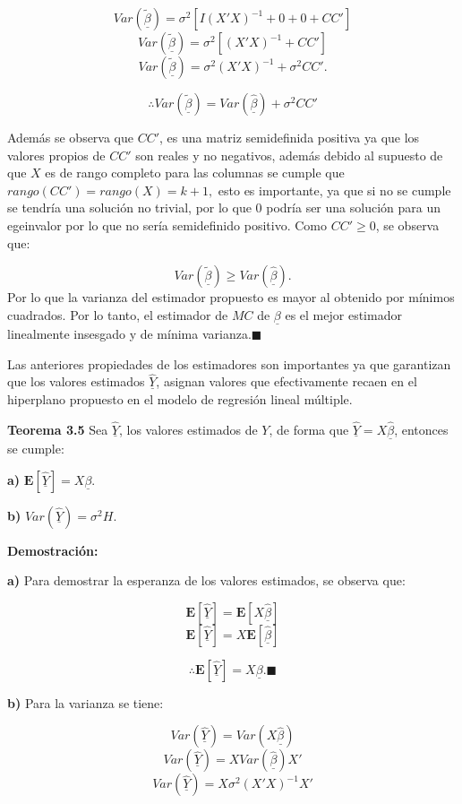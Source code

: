 \documentclass[a4paper,oneside,openany]{book}
\begin{document}
\[Var\left(\underline{\tilde{\beta}}\right)=\sigma^2\left[ I(X'X)^{-1}+0+0+CC'\right]\]
\[Var\left(\underline{\tilde{\beta}}\right)=\sigma^2[(X'X)^{-1}+CC']\]
\[Var\left(\underline{\tilde{\beta}}\right)=\sigma^2(X'X)^{-1}+\sigma^2CC'.\]

\[\therefore Var\left(\underline{\tilde{\beta}}\right)=Var\left(\underline{\hat{\beta}}\right)+\sigma^2CC'\]

Además se observa que \(CC'\), es una matriz semidefinida positiva ya
que los valores propios de \(CC'\) son reales y no negativos, además
debido al supuesto de que \(X\) es de rango completo para las columnas
se cumple que \(rango(CC')=rango(X)=k+1,\) esto es importante, ya que si
no se cumple se tendría una solución no trivial, por lo que \(0\) podría
ser una solución para un egeinvalor por lo que no sería semidefinido
positivo. Como \(CC'\geq0\), se observa que:

\[Var\left(\underline{\tilde{\beta}}\right) \geq Var\left(\underline{\hat{\beta}}\right).\]
Por lo que la varianza del estimador propuesto es mayor al obtenido por
mínimos cuadrados. Por lo tanto, el estimador de \(MC\) de
\(\underline{\beta}\) es el mejor estimador linealmente insesgado y de
mínima varianza.\(\blacksquare\)

Las anteriores propiedades de los estimadores son importantes ya que
garantizan que los valores estimados \(\underline{\hat{Y}}\), asignan
valores que efectivamente recaen en el hiperplano propuesto en el modelo
de regresión lineal múltiple.

\textbf{Teorema 3.5} Sea \(\underline{\hat{Y}}\), los valores estimados
de \(Y\), de forma que \(\underline{\hat{Y}}=X\underline{\hat{\beta}}\),
entonces se cumple:

\textbf{a)} \(\mathbf{E}[\underline{\hat{Y}}]=X\underline{\beta}.\)

\textbf{b)} \(Var(\underline{\hat{Y}})=\sigma^2H.\)

\textbf{Demostración:}

\textbf{a)} Para demostrar la esperanza de los valores estimados, se
observa que:

\[\mathbf{E}[\underline{\hat{Y}}]=\mathbf{E}[X\underline{\hat{\beta}}]\]
\[\mathbf{E}[\underline{\hat{Y}}]=X\mathbf{E}[\underline{\hat{\beta}}]\]

\[\therefore \mathbf{E}[\underline{\hat{Y}}]=X\underline{\beta}. \blacksquare\]

\textbf{b)} Para la varianza se tiene:

\[Var(\underline{\hat{Y}})=Var(X\underline{\hat{\beta}})\]
\[Var(\underline{\hat{Y}})=XVar(\underline{\hat{\beta}})X'\]
\[Var(\underline{\hat{Y}})=X\sigma^2(X'X)^{-1}X'\]
\end{document}
